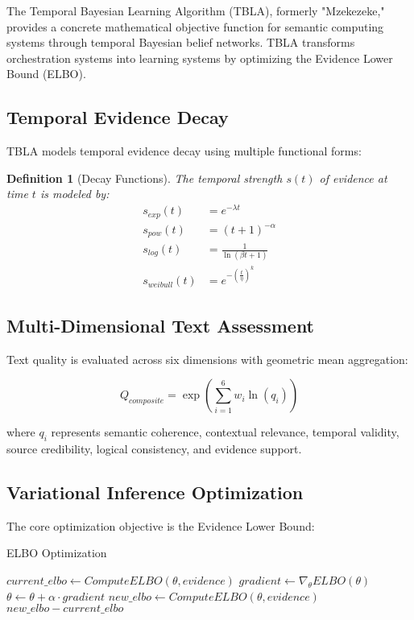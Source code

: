\documentclass[12pt,a4paper]{article}
\newtheorem{definition}[theorem]{Definition}
\begin{document}
The Temporal Bayesian Learning Algorithm (TBLA), formerly "Mzekezeke," provides a concrete mathematical objective function for semantic computing systems through temporal Bayesian belief networks. TBLA transforms orchestration systems into learning systems by optimizing the Evidence Lower Bound (ELBO).

\subsection{Temporal Evidence Decay}

TBLA models temporal evidence decay using multiple functional forms:

\begin{definition}[Decay Functions]
The temporal strength $s(t)$ of evidence at time $t$ is modeled by:
\begin{align}
s_{exp}(t) &= e^{-\lambda t} \\
s_{pow}(t) &= (t + 1)^{-\alpha} \\
s_{log}(t) &= \frac{1}{\ln(\beta t + 1)} \\
s_{weibull}(t) &= e^{-(\frac{t}{\eta})^k}
\end{align}
\end{definition}

\subsection{Multi-Dimensional Text Assessment}

Text quality is evaluated across six dimensions with geometric mean aggregation:

\begin{equation}
Q_{composite} = \exp\left(\sum_{i=1}^{6} w_i \ln(q_i)\right)
\end{equation}

where $q_i$ represents semantic coherence, contextual relevance, temporal validity, source credibility, logical consistency, and evidence support.

\subsection{Variational Inference Optimization}

The core optimization objective is the Evidence Lower Bound:

\begin{algorithm}[H]
\caption{ELBO Optimization}
\begin{algorithmic}[1]
    \State $current\_elbo \leftarrow ComputeELBO(\theta, evidence)$
    \State $gradient \leftarrow \nabla_\theta ELBO(\theta)$
    \State $\theta \leftarrow \theta + \alpha \cdot gradient$
    \State $new\_elbo \leftarrow ComputeELBO(\theta, evidence)$
    \State \Return $new\_elbo - current\_elbo$
\EndFunction
\end{algorithmic}
\end{algorithm}
\end{document}
